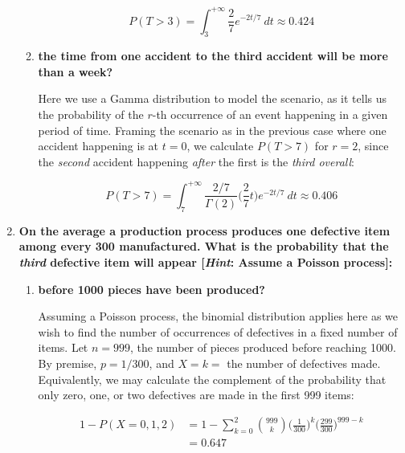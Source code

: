 \documentclass[10pt, oneside]{article}   	%
\theoremstyle{definition}
\begin{document}
\begin{enumerate}[label=9.\arabic*]
\begin{enumerate}
	\[ P(T > 3) = \int^{+\infty}_3 \frac{2}{7} e^{-2t/7} \ dt \approx \boxed{0.424} \]
	
	\item  \begin{tcolorbox}[
	  colback=Cerulean!5!white,
	  colframe=Cerulean!75!black]
	\textbf{the time from one accident to the third accident will be more than a week?}
	\end{tcolorbox}
	
	Here we use a Gamma distribution to model the scenario, as it tells us the probability of the $r$-th occurrence of an event happening in a given period of time. Framing the scenario as in the previous case where one accident happening is at $t = 0$, we calculate $P(T > 7)$ for $r = 2$, since the \textit{second} accident happening \textit{after} the first is the \textit{third overall}:
	
	\[ P(T > 7) = \int^{+\infty}_7 \frac{2/7}{\Gamma(2)} \bigg( \frac{2}{7} t \bigg) e^{-2t/7} \ dt \approx \boxed{0.406} \]
	\end{enumerate}

\item  \begin{tcolorbox}[
  colback=Cerulean!5!white,
  colframe=Cerulean!75!black]
\textbf{On the average a production process produces one defective item among every 300 manufactured. What is the probability that the \textit{third} defective item will appear [\textit{Hint}: Assume a Poisson process]:}
\end{tcolorbox}

	\begin{enumerate}
	\item  \begin{tcolorbox}[
	  colback=Cerulean!5!white,
	  colframe=Cerulean!75!black]
	\textbf{before 1000 pieces have been produced?}
	\end{tcolorbox}
	
	Assuming a Poisson process, the binomial distribution applies here as we wish to find the number of occurrences of defectives in a fixed number of items. Let $n = 999$, the number of pieces produced before reaching 1000. By premise, $p = 1/300$, and $X = k = $ the number of defectives made. Equivalently, we may calculate the complement of the probability that only zero, one, or two defectives are made in the first 999 items:
	
	\begin{align*}
	1 - P(X = 0,1,2) &= 1 - \sum^2_{k=0} \binom{999}{k} \bigg( \frac{1}{300} \bigg)^k \bigg( \frac{299}{300} \bigg)^{999-k} \\
	&= \boxed{0.647}
	\end{align*}
	

\end{enumerate}
\end{enumerate}
\end{document}
